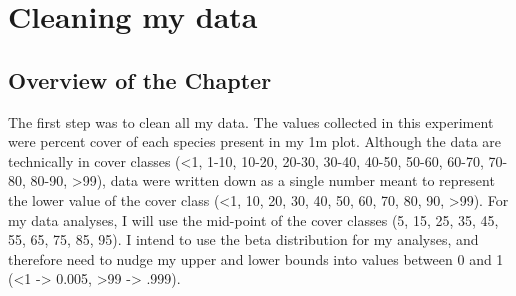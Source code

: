 \documentclass[
]{book}
\newenvironment{Shaded}{\begin{snugshade}}{\end{snugshade}}
\newcommand{\AttributeTok}[1]{\textcolor[rgb]{0.77,0.63,0.00}{#1}}
\newcommand{\ConstantTok}[1]{\textcolor[rgb]{0.00,0.00,0.00}{#1}}
\newcommand{\DecValTok}[1]{\textcolor[rgb]{0.00,0.00,0.81}{#1}}
\newcommand{\FunctionTok}[1]{\textcolor[rgb]{0.00,0.00,0.00}{#1}}
\newcommand{\NormalTok}[1]{#1}
\newcommand{\OtherTok}[1]{\textcolor[rgb]{0.56,0.35,0.01}{#1}}
\newcommand{\SpecialCharTok}[1]{\textcolor[rgb]{0.00,0.00,0.00}{#1}}
\newcommand{\StringTok}[1]{\textcolor[rgb]{0.31,0.60,0.02}{#1}}
\begin{document}
\begin{Shaded}
\end{Shaded}

\hypertarget{cleaning-my-data}{%
\chapter{Cleaning my data}\label{cleaning-my-data}}

\hypertarget{overview-of-the-chapter}{%
\section{Overview of the Chapter}\label{overview-of-the-chapter}}

The first step was to clean all my data. The values collected in this experiment were percent cover of each species present in my 1m plot. Although the data are technically in cover classes (\textless1, 1-10, 10-20, 20-30, 30-40, 40-50, 50-60, 60-70, 70-80, 80-90, \textgreater99), data were written down as a single number meant to represent the lower value of the cover class (\textless1, 10, 20, 30, 40, 50, 60, 70, 80, 90, \textgreater99). For my data analyses, I will use the mid-point of the cover classes (5, 15, 25, 35, 45, 55, 65, 75, 85, 95). I intend to use the beta distribution for my analyses, and therefore need to nudge my upper and lower bounds into values between 0 and 1 (\textless1 -\textgreater{} 0.005, \textgreater99 -\textgreater{} .999).
\end{document}
